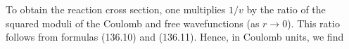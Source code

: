 To obtain the reaction cross section, one multiplies $1/v$ by the ratio of the squared moduli of the Coulomb and free wavefunctions (as $r\to0$). This ratio follows from formulas (136.10) and (136.11). Hence, in Coulomb units, we find

